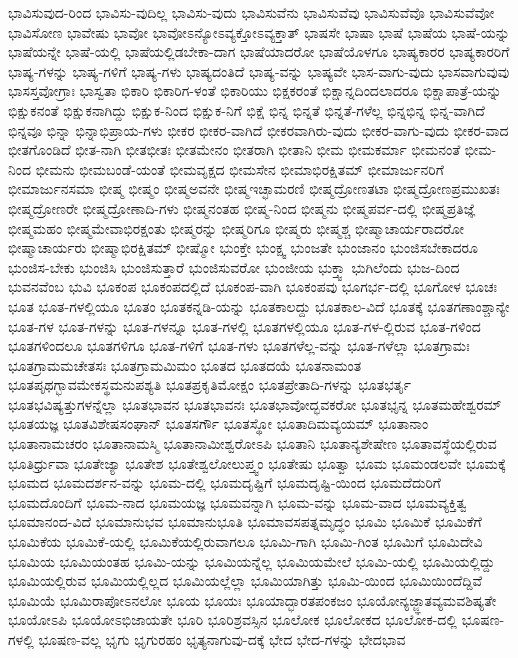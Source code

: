 {ಭಾವಿಸುವುದ-ರಿಂದ
ಭಾವಿಸು-ವುದಿಲ್ಲ
ಭಾವಿಸು-ವುದು
ಭಾವಿಸುವೆನು
ಭಾವಿಸುವೆವು
ಭಾವಿಸುವೆವೊ
ಭಾವಿಸುವೆವೋ
ಭಾವಿಸೋಣ
ಭಾವೇಷು
ಭಾವೋ
ಭಾವೋಽನ್ಯೋಽವ್ಯಕ್ತೋಽವ್ಯಕ್ತಾತ್
ಭಾಷಸೇ
ಭಾಷಾ
ಭಾಷೆ
ಭಾಷೆಯ
ಭಾಷೆ-ಯನ್ನು
ಭಾಷೆಯನ್ನೇ
ಭಾಷೆ-ಯಲ್ಲಿ
ಭಾಷೆಯಲ್ಲಿಡಬೇಕಾ-ದಾಗ
ಭಾಷೆಯಾದರೋ
ಭಾಷೆಯೊಳಗೂ
ಭಾಷ್ಯಕಾರರ
ಭಾಷ್ಯಕಾರರಿಗೆ
ಭಾಷ್ಯ-ಗಳನ್ನು
ಭಾಷ್ಯ-ಗಳಿಗೆ
ಭಾಷ್ಯ-ಗಳು
ಭಾಷ್ಯದಂತಿದೆ
ಭಾಷ್ಯ-ವನ್ನು
ಭಾಷ್ಯವೇ
ಭಾಸ-ವಾಗು-ವುದು
ಭಾಸವಾಗುವುವು
ಭಾಸಸ್ತವೋಗ್ರಾಃ
ಭಾಸ್ವತಾ
ಭಿಕಾರಿ
ಭಿಕಾರಿಗ-ಳಂತೆ
ಭಿಕಾರಿಯು
ಭಿಕ್ಷಕರಂತೆ
ಭಿಕ್ಷಾನ್ನದಿಂದಲಾದರೂ
ಭಿಕ್ಷಾಪಾತ್ರೆ-ಯನ್ನು
ಭಿಕ್ಷುಕನಂತೆ
ಭಿಕ್ಷುಕನಾಗಿದ್ದು
ಭಿಕ್ಷುಕ-ನಿಂದ
ಭಿಕ್ಷುಕ-ನಿಗೆ
ಭಿಕ್ಷೆ
ಭಿನ್ನ
ಭಿನ್ನತೆ
ಭಿನ್ನತೆ-ಗಳೆಲ್ಲ
ಭಿನ್ನಭಿನ್ನ
ಭಿನ್ನ-ವಾಗಿದೆ
ಭಿನ್ನವೂ
ಭಿನ್ನಾ
ಭಿನ್ನಾಭಿಪ್ರಾಯ-ಗಳು
ಭೀಕರ
ಭೀಕರ-ವಾಗಿದೆ
ಭೀಕರವಾಗಿರು-ವುದು
ಭೀಕರ-ವಾಗು-ವುದು
ಭೀಕರ-ವಾದ
ಭೀತಗೊಂಡಿದೆ
ಭೀತ-ನಾಗಿ
ಭೀತಭೀತಃ
ಭೀತಮೇನಂ
ಭೀತರಾಗಿ
ಭೀತಾನಿ
ಭೀಮ
ಭೀಮಕರ್ಮಾ
ಭೀಮನಂತೆ
ಭೀಮ-ನಿಂದ
ಭೀಮನು
ಭೀಮಬಂಡೆ-ಯಂತೆ
ಭೀಮವೃಕ್ಷದ
ಭೀಮಸೇನ
ಭೀಮಾಭಿರಕ್ಷಿತಮ್
ಭೀಮಾರ್ಜುನರಿಗೆ
ಭೀಮಾರ್ಜುನಸಮಾ
ಭೀಷ್ಮ
ಭೀಷ್ಮಂ
ಭೀಷ್ಮಅವನೇ
ಭೀಷ್ಮಇಚ್ಛಾಮರಣಿ
ಭೀಷ್ಮದ್ರೋಣತಟಾ
ಭೀಷ್ಮದ್ರೋಣಪ್ರಮುಖತಃ
ಭೀಷ್ಮದ್ರೋಣರೇ
ಭೀಷ್ಮದ್ರೋಣಾದಿ-ಗಳು
ಭೀಷ್ಮನಂತಹ
ಭೀಷ್ಮ-ನಿಂದ
ಭೀಷ್ಮನು
ಭೀಷ್ಮಪರ್ವ-ದಲ್ಲಿ
ಭೀಷ್ಮಪ್ರತಿಜ್ಞೆ
ಭೀಷ್ಮಮಹಂ
ಭೀಷ್ಮಮೇವಾಭಿರಕ್ಷಂತು
ಭೀಷ್ಮರನ್ನು
ಭೀಷ್ಮರಿಗೂ
ಭೀಷ್ಮರು
ಭೀಷ್ಮಶ್ಚ
ಭೀಷ್ಮಾಚಾರ್ಯರಾದರೋ
ಭೀಷ್ಮಾಚಾರ್ಯರು
ಭೀಷ್ಮಾಭಿರಕ್ಷಿತಮ್
ಭೀಷ್ಮೋ
ಭುಂಕ್ತೇ
ಭುಂಕ್ಷ್ವ
ಭುಂಜತೇ
ಭುಂಜಾನಂ
ಭುಂಜಿಸಬೇಕಾದರೂ
ಭುಂಜಿಸ-ಬೇಕು
ಭುಂಜಿಸಿ
ಭುಂಜಿಸುತ್ತಾರೆ
ಭುಂಜಿಸುವರೋ
ಭುಂಜೀಯ
ಭುಕ್ತ್ವಾ
ಭುಗಿಲೆಂದು
ಭುಜ-ದಿಂದ
ಭುವನವೆಂಬ
ಭುವಿ
ಭೂಕಂಪ
ಭೂಕಂಪದಲ್ಲಿದೆ
ಭೂಕಂಪ-ವಾಗಿ
ಭೂಕಂಪವು
ಭೂಗರ್ಭ-ದಲ್ಲಿ
ಭೂಗೋಳ
ಭೂಚಃ
ಭೂತ
ಭೂತ-ಗಳಲ್ಲಿಯೂ
ಭೂತಂ
ಭೂತಕನ್ನಡಿ-ಯನ್ನು
ಭೂತಕಾಲದ್ದು
ಭೂತಕಾಲ-ವಿದೆ
ಭೂತಕ್ಕೆ
ಭೂತಗಣಾಂಶ್ಚಾನ್ಯೇ
ಭೂತ-ಗಳ
ಭೂತ-ಗಳನ್ನು
ಭೂತ-ಗಳನ್ನೂ
ಭೂತ-ಗಳಲ್ಲಿ
ಭೂತಗಳಲ್ಲಿಯೂ
ಭೂತ-ಗಳ-ಲ್ಲಿರುವ
ಭೂತ-ಗಳಿಂದ
ಭೂತಗಳಿಂದಲೂ
ಭೂತಗಳಿಗೂ
ಭೂತ-ಗಳಿಗೆ
ಭೂತ-ಗಳು
ಭೂತಗಳೆಲ್ಲ-ವನ್ನು
ಭೂತ-ಗಳೆಲ್ಲಾ
ಭೂತಗ್ರಾಮಃ
ಭೂತಗ್ರಾಮಮಚೇತಸಃ
ಭೂತಗ್ರಾಮಮಿಮಂ
ಭೂತದ
ಭೂತದಯೆ
ಭೂತನಾಮಂತ
ಭೂತಪೃಥಗ್ಭಾವಮೇಕಸ್ಥಮನುಪಶ್ಯತಿ
ಭೂತಪ್ರಕೃತಿಮೋಕ್ಷಂ
ಭೂತಪ್ರೇತಾದಿ-ಗಳನ್ನು
ಭೂತಭರ್ತೃ
ಭೂತಭವಿಷ್ಯತ್ತುಗಳನ್ನೆಲ್ಲಾ
ಭೂತಭಾವನ
ಭೂತಭಾವನಃ
ಭೂತಭಾವೋದ್ಭವಕರೋ
ಭೂತಭೃನ್ನ
ಭೂತಮಹೇಶ್ವರಮ್
ಭೂತಯಜ್ಞ
ಭೂತವಿಶೇಷಸಂಘಾನ್
ಭೂತಸರ್ಗೌ
ಭೂತಸ್ಥೋ
ಭೂತಾದಿಮವ್ಯಯಮ್
ಭೂತಾನಾಂ
ಭೂತಾನಾಮಚರಂ
ಭೂತಾನಾಮಸ್ಮಿ
ಭೂತಾನಾಮೀಶ್ವರೋಽಪಿ
ಭೂತಾನಿ
ಭೂತಾನ್ಯಶೇಷೇಣ
ಭೂತಾವಸ್ಥೆಯಲ್ಲಿರುವ
ಭೂತಿರ್ಧ್ರುವಾ
ಭೂತೇಜ್ಯಾ
ಭೂತೇಶ
ಭೂತೇಶ್ವಲೋಲುಪ್ತ್ವಂ
ಭೂತೇಷು
ಭೂತ್ವಾ
ಭೂಮ
ಭೂಮಂಡಲವೇ
ಭೂಮಕ್ಕೆ
ಭೂಮದ
ಭೂಮದರ್ಶನ-ವನ್ನು
ಭೂಮ-ದಲ್ಲಿ
ಭೂಮದೃಷ್ಟಿಗೆ
ಭೂಮದೃಷ್ಟಿ-ಯಿಂದ
ಭೂಮದೆದುರಿಗೆ
ಭೂಮದೊಂದಿಗೆ
ಭೂಮ-ನಾದ
ಭೂಮಯಜ್ಞ
ಭೂಮವನ್ನಾಗಿ
ಭೂಮ-ವನ್ನು
ಭೂಮ-ವಾದ
ಭೂಮವ್ಯಕ್ತಿತ್ವ
ಭೂಮಾನಂದ-ವಿದೆ
ಭೂಮಾನುಭವ
ಭೂಮಾನುಭೂತಿ
ಭೂಮಾವಸಪತ್ನಮೃದ್ಧಂ
ಭೂಮಿ
ಭೂಮಿಕೆ
ಭೂಮಿಕೆಗೆ
ಭೂಮಿಕೆಯ
ಭೂಮಿಕೆ-ಯಲ್ಲಿ
ಭೂಮಿಕೆಯಲ್ಲಿರುವಾಗಲೂ
ಭೂಮಿ-ಗಾಗಿ
ಭೂಮಿ-ಗಿಂತ
ಭೂಮಿಗೆ
ಭೂಮಿದೇವಿ
ಭೂಮಿಯ
ಭೂಮಿಯಂತಹ
ಭೂಮಿ-ಯನ್ನು
ಭೂಮಿಯನ್ನೆಲ್ಲ
ಭೂಮಿಯಮೇಲೆ
ಭೂಮಿ-ಯಲ್ಲಿ
ಭೂಮಿಯಲ್ಲಿದ್ದು
ಭೂಮಿಯಲ್ಲಿರುವ
ಭೂಮಿಯಲ್ಲಿಲ್ಲದ
ಭೂಮಿಯಲ್ಲೆಲ್ಲಾ
ಭೂಮಿಯಾಗಿತ್ತು
ಭೂಮಿ-ಯಿಂದ
ಭೂಮಿಯಿಂದೆದ್ದಿವೆ
ಭೂಮಿಯೆ
ಭೂಮಿರಾಪೋಽನಲೋ
ಭೂಯ
ಭೂಯಃ
ಭೂಯಾದ್ಭಾರತಪಂಕಜಂ
ಭೂಯೋನ್ಯಜ್ಜ್ಞಾತವ್ಯಮವಶಿಷ್ಯತೇ
ಭೂಯೋಽಪಿ
ಭೂಯೋಽಭಿಜಾಯತೇ
ಭೂರಿ
ಭೂರಿಶ್ರವಸ್ಸಿನ
ಭೂಲೋಕ
ಭೂಲೋಕದ
ಭೂಲೋಕ-ದಲ್ಲಿ
ಭೂಷಣ-ಗಳಲ್ಲಿ
ಭೂಷಣ-ವಲ್ಲ
ಭೃಗು
ಭೃಗುರಹಂ
ಭೃತ್ಯನಾಗುವು-ದಕ್ಕೆ
ಭೇದ
ಭೇದ-ಗಳನ್ನು
ಭೇದಭಾವ
}
